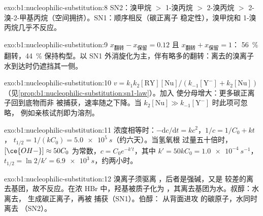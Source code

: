 \begin{solution}{exo:b1:nucleophilic-substitution:8}
SN2：溴甲烷 $>$ 1-溴丙烷 $>$ 2-溴丙烷 $>$
2-溴-2-甲基丙烷（空间拥挤）。SN1：顺序相反（碳正离子
稳定性），溴甲烷和 1-溴丙烷几乎不反应。
\end{solution}

\begin{solution}{exo:b1:nucleophilic-substitution:9}
$x_{\text{翻转}} - x_{\text{保留}} = 0.12$ 且 $x_{\text{翻转}} + x_{\text{保留}} = 1$：
\qty{56}{\percent} 翻转，\qty{44}{\percent} 保持构型。以 SN1
外消旋化为主，伴有略多的翻转：离去的溴离子
水到达时仍遮挡其一侧。
\end{solution}

\begin{solution}{exo:b1:nucleophilic-substitution:10}
$v = k_1k_2[\mathrm{RY}][\mathrm{Nu}]/(k_{-1}[\mathrm{Y^-}] + k_2[\mathrm{Nu}])$
（见\cref{prop:b1:nucleophilic-substitution:sn1-law}）。加入 
使分母增大：更多碳正离子回到底物而非
被捕获，速率随之下降。当
$k_2[\mathrm{Nu}] \gg k_{-1}[\mathrm{Y^-}]$ 时此项可忽略，
例如亲核试剂即为溶剂。
\end{solution}

\begin{solution}{exo:b1:nucleophilic-substitution:11}
浓度相等时：$-\mathrm{d}c/\mathrm{d}t = kc^2$，$1/c = 1/C_0 + kt$，
$t_{1/2} = 1/(kC_0) = \qty{5.0e5}{s}$（约六天）。当氢氧根
过量五十倍时，$[\ce{OH-}] \approx 50C_0$ 为常数，$c = C_0
e^{-k't}$，其中 $k' = 50kC_0 = \qty{1.0e-4}{s^{-1}}$，$t_{1/2} = \ln 2/k' =
\qty{6.9e3}{s}$，约两小时。
\end{solution}

\begin{solution}{exo:b1:nucleophilic-substitution:12}
溴离子须驱离 ，后者是强碱，又是
较差的离去基团，故不反应。在浓 HBr 中，羟基被质子化为
，其离去基团为水。叔醇：水离去，
生成碳正离子，再被  捕获（SN1）。伯醇：
 从背面进攻  的碳原子，水同时离去
（SN2）。
\end{solution}

